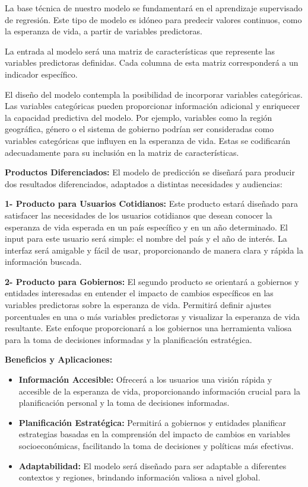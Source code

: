 \documentclass{other/docTemplate}
\begin{document}
La base técnica de nuestro modelo se fundamentará en el aprendizaje supervisado de regresión. Este tipo de modelo es idóneo para predecir valores continuos, como la esperanza de vida, a partir de variables predictoras. 

La entrada al modelo será una matriz de características que represente las variables predictoras definidas. Cada columna de esta matriz corresponderá a un indicador específico. 

El diseño del modelo contempla la posibilidad de incorporar variables categóricas. Las variables categóricas pueden proporcionar información adicional y enriquecer la capacidad predictiva del modelo. Por ejemplo, variables como la región geográfica, género o el sistema de gobierno podrían ser consideradas como variables categóricas que influyen en la esperanza de vida. Estas se codificarán adecuadamente para su inclusión en la matriz de características.

\textbf{Productos Diferenciados:}
El modelo de predicción se diseñará para producir dos resultados diferenciados, adaptados a distintas necesidades y audiencias:

\textbf{1- Producto para Usuarios Cotidianos:}
Este producto estará diseñado para satisfacer las necesidades de los usuarios cotidianos que desean conocer la esperanza de vida esperada en un país específico y en un año determinado. El input para este usuario será simple: el nombre del país y el año de interés. La interfaz será amigable y fácil de usar, proporcionando de manera clara y rápida la información buscada.

\textbf{2- Producto para Gobiernos:}
El segundo producto se orientará a gobiernos y entidades interesadas en entender el impacto de cambios específicos en las variables predictoras sobre la esperanza de vida. Permitirá definir ajustes porcentuales en una o más variables predictoras y visualizar la esperanza de vida resultante. Este enfoque proporcionará a los gobiernos una herramienta valiosa para la toma de decisiones informadas y la planificación estratégica.

\textbf{Beneficios y Aplicaciones:}
\begin{itemize}
  \item \textbf{Información Accesible:} Ofrecerá a los usuarios una visión rápida y accesible de la esperanza de vida, proporcionando información crucial para la planificación personal y la toma de decisiones informadas.
  \item \textbf{Planificación Estratégica:} Permitirá a gobiernos y entidades planificar estrategias basadas en la comprensión del impacto de cambios en variables socioeconómicas, facilitando la toma de decisiones y políticas más efectivas.
  \item \textbf{Adaptabilidad:} El modelo será diseñado para ser adaptable a diferentes contextos y regiones, brindando información valiosa a nivel global.
\end{itemize}
\end{document}
